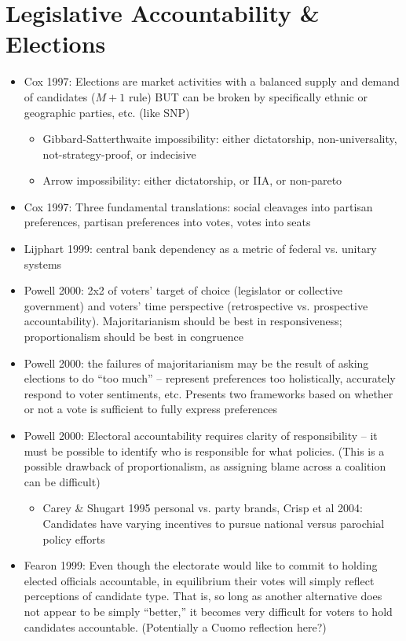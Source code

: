 \documentclass[12pt]{article}
\begin{document}
\section*{Legislative Accountability \& Elections}

\begin{itemize}
    \item Cox 1997: Elections are market activities with a balanced supply and demand of candidates ($M+1$ rule) BUT can be broken by specifically ethnic or geographic parties, etc. (like SNP)
    \begin{itemize}
        \item Gibbard-Satterthwaite impossibility: either dictatorship, non-universality, not-strategy-proof, or indecisive
        \item Arrow impossibility: either dictatorship, or IIA, or non-pareto
    \end{itemize}
    \item Cox 1997: Three fundamental translations: social cleavages into partisan preferences, partisan preferences into votes, votes into seats
    \item Lijphart 1999: central bank dependency as a metric of federal vs. unitary systems
    \item Powell 2000: 2x2 of voters' target of choice (legislator or collective government) and voters' time perspective (retrospective vs. prospective accountability). Majoritarianism should be best in responsiveness; proportionalism should be best in congruence
    \item Powell 2000: the failures of majoritarianism may be the result of asking elections to do ``too much'' -- represent preferences too holistically, accurately respond to voter sentiments, etc. Presents two frameworks based on whether or not a vote is sufficient to fully express preferences
    \item Powell 2000: Electoral accountability requires clarity of responsibility -- it must be possible to identify who is responsible for what policies. (This is a possible drawback of proportionalism, as assigning blame across a coalition can be difficult)
    \begin{itemize}
        \item Carey \& Shugart 1995 personal vs. party brands, Crisp et al 2004: Candidates have varying incentives to pursue national versus parochial policy efforts
    \end{itemize}
    \item Fearon 1999: Even though the electorate would like to commit to holding elected officials accountable, in equilibrium their votes will simply reflect perceptions of candidate type. That is, so long as another alternative does not appear to be simply ``better,'' it becomes very difficult for voters to hold candidates accountable. (Potentially a Cuomo reflection here?)
\end{itemize}
\end{document}
